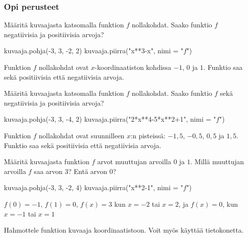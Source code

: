\begin{tehtavasivu}


\subsubsection*{Opi perusteet}
\begin{tehtava}
Määritä kuvaajasta katsomalla funktion $f$ nollakohdat. Saako funktio $f$ negatiivisia ja positiivisia arvoja?
\begin{kuva}
    kuvaaja.pohja(-3, 3, -2, 2)
    kuvaaja.piirra("x**3-x", nimi = "$f$")
\end{kuva}
\begin{vastaus}
Funktion $f$ nollakohdat ovat $x$-koordinaatiston kohdissa $-1$, $0$ ja $1$. Funktio saa sekä positiivisia että negatiivisia arvoja.
\end{vastaus}
\end{tehtava}

\begin{tehtava}
Määritä kuvaajasta katsomalla funktion $f$ nollakohdat. Saako funktio $f$ sekä negatiivisia ja positiivisia arvoja?
\begin{kuva}
    kuvaaja.pohja(-3, 3, -4, 2)
    kuvaaja.piirra("2*x**4-5*x**2+1", nimi = "$f$")
\end{kuva}
	\begin{vastaus}
Funktion $f$ nollakohdat ovat suunnilleen $x$:n pisteissä: $-1,5$, $-0,5$, $0,5$ ja $1,5$. Funktio saa sekä positiivisia että negatiivisia arvoja.
	\end{vastaus}
\end{tehtava}

\begin{tehtava}
Määritä kuvaajasta funktion $f$ arvot muuttujan arvoilla $0$ ja $1$. Millä muuttujan arvoilla $f$ saa arvon $3$? Entä arvon $0$?
\begin{kuva}
    kuvaaja.pohja(-3, 3, -2, 4)
    kuvaaja.piirra("x**2-1", nimi = "$f$")
\end{kuva}
\begin{vastaus}
 $f(0)=-1$, $f(1)=0$, $f(x)=3$ kun $x=-2$ tai $x=2$, ja $f(x)=0$, kun $x=-1$ tai $x=1$
\end{vastaus}
\end{tehtava}

\begin{tehtava}
Hahmottele funktion kuvaaja koordinaatistoon. Voit myös käyttää tietokonetta.
%	
\end{tehtava} %


\end{tehtavasivu}

